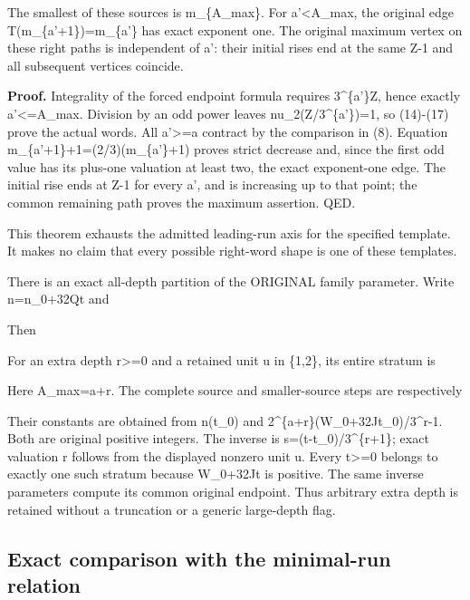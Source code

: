 The smallest of these sources is m\_\{A\_max\}. For a'\textless A\_max,
the original edge T(m\_\{a'+1\})=m\_\{a'\} has exact exponent one. The
original maximum vertex on these right paths is independent of a': their
initial rises end at the same Z-1 and all subsequent vertices coincide.

\textbf{Proof.} Integrality of the forced endpoint formula requires
3\^{}\{a'\}\textbar Z, hence exactly a'\textless=A\_max. Division by an
odd power leaves nu\_2(Z/3\^{}\{a'\})=1, so (14)-(17) prove the actual
words. All a'\textgreater=a contract by the comparison in (8). Equation
m\_\{a'+1\}+1=(2/3)(m\_\{a'\}+1) proves strict decrease and, since the
first odd value has its plus-one valuation at least two, the exact
exponent-one edge. The initial rise ends at Z-1 for every a', and is
increasing up to that point; the common remaining path proves the
maximum assertion. QED.

This theorem exhausts the admitted leading-run axis for the specified
template. It makes no claim that every possible right-word shape is one
of these templates.

There is an exact all-depth partition of the ORIGINAL family parameter.
Write n=n\_0+32Qt and


Then


For an extra depth r\textgreater=0 and a retained unit u in \{1,2\}, its
entire stratum is


Here A\_max=a+r. The complete source and smaller-source steps are
respectively


Their constants are obtained from n(t\_0) and
2\^{}\{a+r\}(W\_0+32Jt\_0)/3\^{}r-1. Both are original positive
integers. The inverse is s=(t-t\_0)/3\^{}\{r+1\}; exact valuation r
follows from the displayed nonzero unit u. Every t\textgreater=0 belongs
to exactly one such stratum because W\_0+32Jt is positive. The same
inverse parameters compute its common original endpoint. Thus arbitrary
extra depth is retained without a truncation or a generic large-depth
flag.

\subsection{Exact comparison with the minimal-run relation}


